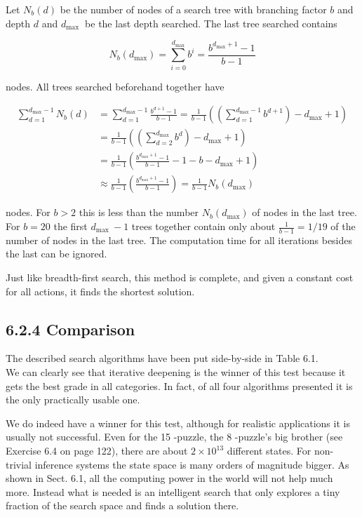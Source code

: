 \documentclass[10pt]{book}
\begin{document}
\begin{center}
Let $N_{b}(d)$ be the number of nodes of a search tree with branching factor $b$ and depth $d$ and $d_{\text {max }}$ be the last depth searched. The last tree searched contains

$$
N_{b}\left(d_{\max }\right)=\sum_{i=0}^{d_{\max }} b^{i}=\frac{b^{d_{\max }+1}-1}{b-1}
$$

nodes. All trees searched beforehand together have

$$
\begin{aligned}
\sum_{d=1}^{d_{\max }-1} N_{b}(d) & =\sum_{d=1}^{d_{\max }-1} \frac{b^{d+1}-1}{b-1}=\frac{1}{b-1}\left(\left(\sum_{d=1}^{d_{\max }-1} b^{d+1}\right)-d_{\max }+1\right) \\
& =\frac{1}{b-1}\left(\left(\sum_{d=2}^{d_{\max }} b^{d}\right)-d_{\max }+1\right) \\
& =\frac{1}{b-1}\left(\frac{b^{d_{\max }+1}-1}{b-1}-1-b-d_{\max }+1\right) \\
& \approx \frac{1}{b-1}\left(\frac{b^{d_{\max }+1}-1}{b-1}\right)=\frac{1}{b-1} N_{b}\left(d_{\max }\right)
\end{aligned}
$$

nodes. For $b>2$ this is less than the number $N_{b}\left(d_{\max }\right)$ of nodes in the last tree. For $b=20$ the first $d_{\text {max }}-1$ trees together contain only about $\frac{1}{b-1}=1 / 19$ of the number of nodes in the last tree. The computation time for all iterations besides the last can be ignored.

Just like breadth-first search, this method is complete, and given a constant cost for all actions, it finds the shortest solution.

\subsection*{6.2.4 Comparison}
The described search algorithms have been put side-by-side in Table 6.1.\\
We can clearly see that iterative deepening is the winner of this test because it gets the best grade in all categories. In fact, of all four algorithms presented it is the only practically usable one.

We do indeed have a winner for this test, although for realistic applications it is usually not successful. Even for the 15 -puzzle, the 8 -puzzle's big brother (see Exercise 6.4 on page 122), there are about $2 \times 10^{13}$ different states. For non-trivial inference systems the state space is many orders of magnitude bigger. As shown in Sect. 6.1, all the computing power in the world will not help much more. Instead what is needed is an intelligent search that only explores a tiny fraction of the search space and finds a solution there.


\end{center}
\end{document}
